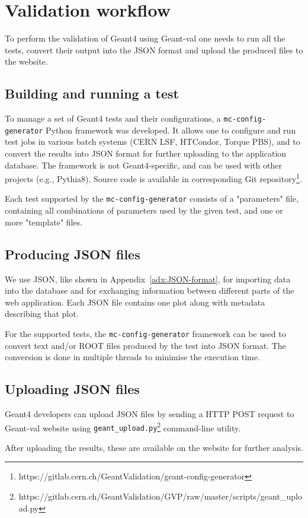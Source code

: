 \section{Validation workflow}
\label{sec-workflow}

To perform the validation of Geant4 using \textsf{Geant-val} one needs to run all the tests, convert their output into the JSON format and upload the produced files to the website.

\subsection{Building and running a test}

To manage a set of Geant4 tests and their configurations, a {\tt mc-config-generator} Python framework was developed. It allows one to configure and run test jobs in various batch systems (CERN LSF, HTCondor, Torque PBS), and to convert the results into  JSON format for further uploading to the application database. The framework is not Geant4-specific, and can be used with other projects (e.g., Pythia8). Source code is available in corresponding Git repository\footnote{https://gitlab.cern.ch/GeantValidation/geant-config-generator}.

Each test supported by the {\tt mc-config-generator} consists of a "parameters" file, containing all combinations of parameters used by the given test, and one or more "template" files.

\subsection{Producing JSON files}

We use JSON, like shown in Appendix~\ref{adx:JSON-format}, for importing data into the database and for exchanging information between different parts of the web application. Each JSON file contains one plot along with metadata describing that plot.

For the supported tests, the {\tt mc-config-generator} framework can be used to convert text and/or ROOT files produced by the test into JSON format. The conversion is done in multiple threads to minimise the execution time.

\subsection{Uploading JSON files}

Geant4 developers can upload JSON files by sending a HTTP POST request to \textsf{Geant-val} website using {\tt geant\_upload.py}\footnote{https://gitlab.cern.ch/GeantValidation/GVP/raw/master/scripts/geant\_upload.py} command-line utility.

After uploading the results, these are available on the website for further analysis.

